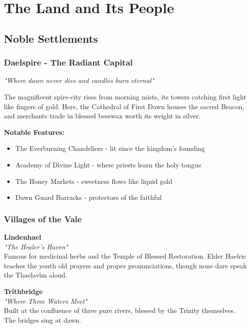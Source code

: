 \documentclass[11pt,a4paper,twoside]{book}
\begin{document}
\chapter{The Land and Its People}

\section{Noble Settlements}

\subsection{Daelspire - The Radiant Capital}

\begin{tcolorbox}[heroicbox={Daelspire}]
\textit{"Where dawn never dies and candles burn eternal"}

The magnificent spire-city rises from morning mists, its towers catching first light like fingers of gold. Here, the Cathedral of First Dawn houses the sacred Beacon, and merchants trade in blessed beeswax worth its weight in silver.
\end{tcolorbox}

\textbf{Notable Features:}
\begin{itemize}
    \item The Everburning Chandeliers - lit since the kingdom's founding
    \item Academy of Divine Light - where priests learn the holy tongue
    \item The Honey Markets - sweetness flows like liquid gold
    \item Dawn Guard Barracks - protectors of the faithful
\end{itemize}

\subsection{Villages of the Vale}

\begin{multicols}{2}
\textbf{Lindenhael}\\
\textit{"The Healer's Haven"}\\
Famous for medicinal herbs and the Temple of Blessed Restoration. Elder Haelric teaches the youth old prayers and proper pronunciations, though none dare speak the Thaelavîm aloud.

\columnbreak

\textbf{Tríthbridge}\\
\textit{"Where Three Waters Meet"}\\
Built at the confluence of three pure rivers, blessed by the Trinity themselves. The bridges sing at dawn.
\end{multicols}
\end{document}
